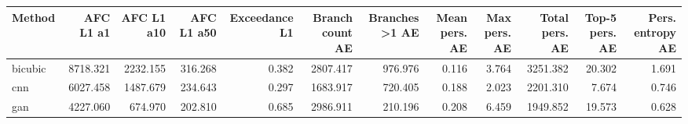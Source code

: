 \begin{tabular}{lrrrrrrrrrrr}
\toprule
Method & AFC L1 a1 & AFC L1 a10 & AFC L1 a50 & Exceedance L1 & Branch count AE & Branches >1 AE & Mean pers. AE & Max pers. AE & Total pers. AE & Top-5 pers. AE & Pers. entropy AE \\
\midrule
bicubic & 8718.321 & 2232.155 & 316.268 & 0.382 & 2807.417 & 976.976 & 0.116 & 3.764 & 3251.382 & 20.302 & 1.691 \\
cnn & 6027.458 & 1487.679 & 234.643 & 0.297 & 1683.917 & 720.405 & 0.188 & 2.023 & 2201.310 & 7.674 & 0.746 \\
gan & 4227.060 & 674.970 & 202.810 & 0.685 & 2986.911 & 210.196 & 0.208 & 6.459 & 1949.852 & 19.573 & 0.628 \\
\bottomrule
\end{tabular}
